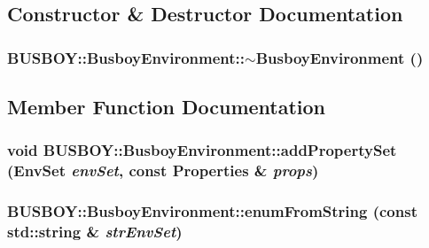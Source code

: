 \subsection{Constructor \& Destructor Documentation}
\hypertarget{classBUSBOY_1_1BusboyEnvironment_a8612366d6249caecac58b1ea9f30e514}{
\subsubsection[{$\sim$BusboyEnvironment}]{\setlength{\rightskip}{0pt plus 5cm}BUSBOY::BusboyEnvironment::$\sim$BusboyEnvironment ()}}
\label{classBUSBOY_1_1BusboyEnvironment_a8612366d6249caecac58b1ea9f30e514}


\subsection{Member Function Documentation}
\hypertarget{classBUSBOY_1_1BusboyEnvironment_a92aebf474cd88558005f88ec2738d622}{
\subsubsection[{addPropertySet}]{\setlength{\rightskip}{0pt plus 5cm}void BUSBOY::BusboyEnvironment::addPropertySet ({\bf EnvSet} {\em envSet}, \/  const {\bf Properties} \& {\em props})}}
\label{classBUSBOY_1_1BusboyEnvironment_a92aebf474cd88558005f88ec2738d622}
\hypertarget{classBUSBOY_1_1BusboyEnvironment_a51027f0a6a448a5b8bf4588a9055fdb6}{
\subsubsection[{enumFromString}]{ BUSBOY::BusboyEnvironment::enumFromString (const std::string \& {\em strEnvSet})}}
\label{classBUSBOY_1_1BusboyEnvironment_a51027f0a6a448a5b8bf4588a9055fdb6}


